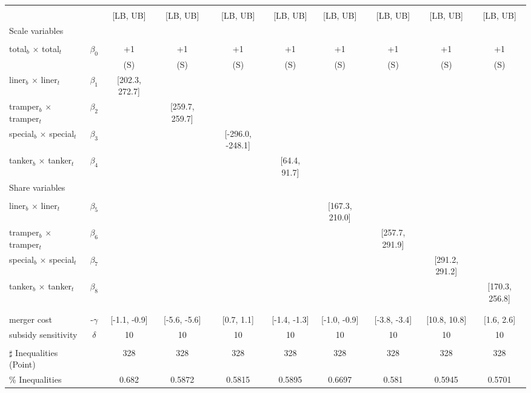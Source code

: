 \begin{tabular}{@{\extracolsep{5pt}}lccccccccc}
\toprule 
 &  &  &  &  &  &  &  &  &  \\
 &  & [LB, UB] & [LB, UB] & [LB, UB] & [LB, UB] & [LB, UB] & [LB, UB] & [LB, UB] & [LB, UB] \\
\midrule 
Scale variables &  &  &  &  &  &  &  \\
 &  &  &  &  &  &  &  &  \\
total$_{b}$ $\times$ total$_{t}$ & $\beta_0$ & +1 & +1 & +1 & +1 & +1 & +1 & +1 & +1 \\
 &  & (S) & (S) & (S) & (S) & (S) & (S) & (S) & (S) \\
liner$_{b}$ $\times$ liner$_{t}$ & $\beta_1$ & [202.3, 272.7] &  &  &  &  &  &  &  \\
tramper$_{b}$ $\times$ tramper$_{t}$ & $\beta_2$ &  & [259.7, 259.7] &  &  &  &  &  &  \\
special$_{b}$ $\times$ special$_{t}$ & $\beta_3$ &  &  & [-296.0, -248.1] &  &  &  &  &  \\
tanker$_{b}$ $\times$ tanker$_{t}$ & $\beta_4$ &  &  &  & [64.4, 91.7] &  &  &  &  \\
Share variables &  &  &  &  &  &  &  &  &  \\
 &  &  &  &  &  &  &  &  &  \\
liner$_{b}$ $\times$ liner$_{t}$ & $\beta_5$ &  &  &  &  & [167.3, 210.0] &  &  &  \\
tramper$_{b}$ $\times$ tramper$_{t}$ & $\beta_6$ &  &  &  &  &  & [257.7, 291.9] &  &  \\
special$_{b}$ $\times$ special$_{t}$ & $\beta_7$ &  &  &  &  &  &  & [291.2, 291.2] &  \\
tanker$_{b}$ $\times$ tanker$_{t}$ & $\beta_8$ &  &  &  &  &  &  &  & [170.3, 256.8] \\
 &  &  &  &  &  &  &  &  &  \\
 &  &  &  &  &  &  &  &  &  \\
merger cost & -$\gamma$ & [-1.1, -0.9] & [-5.6, -5.6] & [0.7, 1.1] & [-1.4, -1.3] & [-1.0, -0.9] & [-3.8, -3.4] & [10.8, 10.8] & [1.6, 2.6] \\
subsidy sensitivity & $\delta$ & 10 & 10 & 10 & 10 & 10 & 10 & 10 & 10 \\
 &  &  &  &  &  &  &  &  &  \\
\hline 
$\sharp$ Inequalities (Point) &  & 328 & 328 & 328 & 328 & 328 & 328 & 328 & 328 \\
\% Inequalities &  & 0.682 & 0.5872 & 0.5815 & 0.5895 & 0.6697 & 0.581 & 0.5945 & 0.5701 \\
\bottomrule 
\end{tabular}
